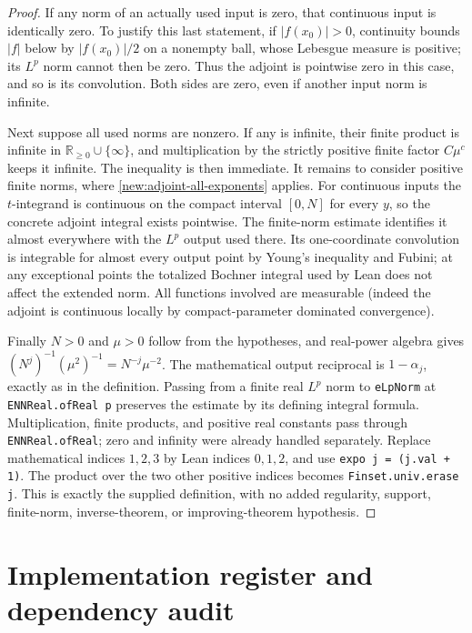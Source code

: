 \documentclass[11pt]{article}
\theoremstyle{definition}
\newcommand{\pid}[1]{\nolinkurl{#1}}
\begin{document}
\begin{proof}
If any norm of an actually used input is zero, that continuous input is identically zero.
To justify this last statement, if $|f(x_0)|>0$, continuity bounds $|f|$ below by
$|f(x_0)|/2$ on a nonempty ball, whose Lebesgue measure is positive; its $L^p$ norm cannot
then be zero. Thus the adjoint is pointwise zero in this case, and so is its convolution.
Both sides are zero, even if another input norm is infinite.

Next suppose all used norms are nonzero. If any is infinite, their finite product is
infinite in $\mathbb R_{\geq0}\cup\{\infty\}$, and multiplication by the strictly positive
finite factor $C\mu^c$ keeps it infinite. The inequality is then immediate. It remains to
consider positive finite norms, where \cref{new:adjoint-all-exponents} applies.
For continuous inputs the $t$-integrand is continuous on the compact interval $[0,N]$ for
every $y$, so the concrete adjoint integral exists pointwise. The finite-norm estimate
identifies it almost everywhere with the $L^p$ output used there. Its one-coordinate
convolution is integrable for almost every output point by Young's inequality and Fubini;
at any exceptional points the totalized Bochner integral used by Lean does not affect the
extended norm. All functions involved are measurable (indeed the adjoint is continuous
locally by compact-parameter dominated convergence).

Finally $N>0$ and $\mu>0$ follow from the hypotheses, and real-power algebra gives
$(N^j)^{-1}(\mu^2)^{-1}=N^{-j}\mu^{-2}$. The mathematical output reciprocal is
$1-\alpha_j$, exactly as in the definition. Passing from a finite real $L^p$ norm to
\pid{eLpNorm} at \pid{ENNReal.ofReal p} preserves the estimate by its defining integral
formula. Multiplication, finite products, and positive real constants pass through
\pid{ENNReal.ofReal}; zero and infinity were already handled separately.
Replace mathematical indices $1,2,3$ by Lean indices $0,1,2$, and use
\pid{expo j = (j.val + 1)}. The product over the two other positive indices becomes
\pid{Finset.univ.erase j}. This is exactly the supplied definition, with no added
regularity, support, finite-norm, inverse-theorem, or improving-theorem hypothesis.
\end{proof}


\section{Implementation register and dependency audit}\label{new:register}
\end{document}
